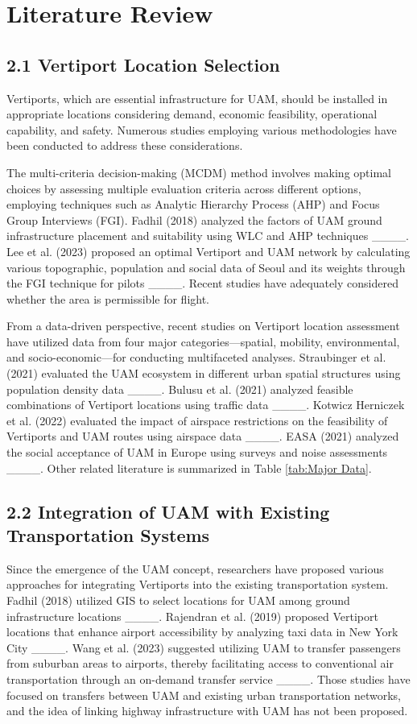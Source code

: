 \section{Literature Review}
\subsection{2.1 Vertiport Location Selection}
Vertiports, which are essential infrastructure for UAM, should be installed in appropriate locations considering demand, economic feasibility, operational capability, and safety. Numerous studies employing various methodologies have been conducted to address these considerations.

The multi-criteria decision-making (MCDM) method involves making optimal choices by assessing multiple evaluation criteria across different options, employing techniques such as Analytic Hierarchy Process (AHP) and Focus Group Interviews (FGI). Fadhil (2018) analyzed the factors of UAM ground infrastructure placement and suitability using WLC and AHP techniques ____. Lee et al. (2023) proposed an optimal Vertiport and UAM network by calculating various topographic, population and social data of Seoul and its weights through the FGI technique for pilots ____. Recent studies have adequately considered whether the area is permissible for flight. 

From a data-driven perspective, recent studies on Vertiport location assessment have utilized data from four major categories—spatial, mobility, environmental, and socio-economic—for conducting multifaceted analyses. Straubinger et al. (2021) evaluated the UAM ecosystem in different urban spatial structures using population density data ____. Bulusu et al. (2021) analyzed feasible combinations of Vertiport locations using traffic data ____. Kotwicz Herniczek et al. (2022) evaluated the impact of airspace restrictions on the feasibility of Vertiports and UAM routes using airspace data ____. EASA (2021) analyzed the social acceptance of UAM in Europe using surveys and noise assessments ____. Other related literature is summarized in Table \ref{tab:Major Data}.


\subsection{2.2 Integration of UAM with Existing Transportation Systems}

Since the emergence of the UAM concept, researchers have proposed various approaches for integrating Vertiports into the existing transportation system. Fadhil (2018) utilized GIS to select locations for UAM among ground infrastructure locations ____. Rajendran et al. (2019) proposed Vertiport locations that enhance airport accessibility by analyzing taxi data in New York City ____. Wang et al. (2023) suggested utilizing UAM to transfer passengers from suburban areas to airports, thereby facilitating access to conventional air transportation through an on-demand transfer service ____. Those studies have focused on transfers between UAM and existing urban transportation networks, and the idea of linking highway infrastructure with UAM has not been proposed.


